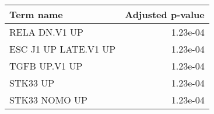 \begin{tabular}{lr}
\toprule
           Term name &  Adjusted p-value \\
\midrule
       RELA DN.V1 UP &          1.23e-04 \\
ESC J1 UP LATE.V1 UP &          1.23e-04 \\
       TGFB UP.V1 UP &          1.23e-04 \\
            STK33 UP &          1.23e-04 \\
       STK33 NOMO UP &          1.23e-04 \\
\bottomrule
\end{tabular}
